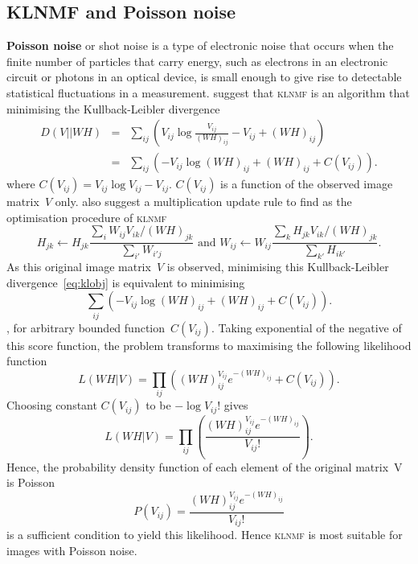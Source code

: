 \subsection{KLNMF and Poisson noise}
\textbf{Poisson noise} or shot noise is a type of electronic noise that
occurs when the finite number of particles that carry energy,
such as electrons in an electronic circuit or photons in an optical
device, is small enough to give rise to detectable statistical
fluctuations in a measurement.
\citet{lee2001algorithms} suggest that \textsc{klnmf} is an algorithm that minimising the Kullback-Leibler divergence
\begin{eqnarray}
  D(V||WH)&=&\sum_{ij}\left(V_{ij}\log\frac{V_{ij}}{\left(WH\right)_{ij}}-V_{ij}+\left(WH\right)_{ij}\right)\nonumber\\
          &=&\sum_{ij}\left(-V_{ij}\log\left(WH\right)_{ij}+\left(WH\right)_{ij}+C(V_{ij})\right).\label{eq:klobj}
\end{eqnarray}
where $C(V_{ij})=V_{ij}\log V_{ij}-V_{ij}$. $C(V_{ij})$ is a function of the observed image matrix~$V$ only.
\citet{lee2001algorithms} also suggest a multiplication update rule to find as the optimisation procedure of \textsc{klnmf}
\begin{equation}
H_{jk}\leftarrow H_{jk}\frac{\sum_{i}W_{ij}V_{ik}/(WH)_{jk}}{\sum_{i'}W_{i'j}} \text{ and } W_{ij}\leftarrow W_{ij}\frac{\sum_{k}H_{jk}V_{ik}/(WH)_{jk}}{\sum_{k'}H_{ik'}}. \label{eq:klnmf}
\end{equation}
As this original image matrix~$V$ is observed, minimising this Kullback-Leibler divergence~\eqref{eq:klobj} is equivalent to minimising
\begin{equation*}
  \sum_{ij}\left(-V_{ij}\log\left(WH\right)_{ij}+\left(WH\right)_{ij}+C(V_{ij})\right).
\end{equation*},
for arbitrary bounded function~$C(V_{ij})$. Taking exponential of the negative of this score function, the problem transforms to maximising the following likelihood function
\begin{equation*}
L(WH|V)=\prod_{ij}\left(\left(WH\right)_{ij}^{V_{ij}}e^{-\left(WH\right)_{ij}}+C(V_{ij})\right).
\end{equation*}
Choosing constant $C(V_{ij})$ to be $-\log V_{ij}!$ gives
\begin{equation*}
L(WH|V)=\prod_{ij}\left(\frac{\left(WH\right)_{ij}^{V_{ij}}e^{-\left(WH\right)_{ij}}}{V_{ij}!}\right).
\end{equation*}
Hence, the probability density function of each element of the original matrix~V is Poisson
\begin{equation*}
P(V_{ij})=\frac{\left(WH\right)_{ij}^{V_{ij}}e^{-\left(WH\right)_{ij}}}{V_{ij}!}
\end{equation*}
is a sufficient condition to yield this likelihood. Hence \textsc{klnmf} is most suitable for images with Poisson noise.

